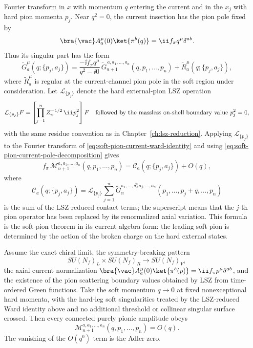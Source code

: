 Fourier transform in \(x\) with momentum \(q\) entering the current and in
the \(x_j\) with hard pion momenta \(p_j\).  Near \(q^2=0\), the current
insertion has the pion pole fixed by
\[
  \bra{\vac}A_a^\mu(0)\ket{\pi^b(q)}
  =
  \ii f_\pi q^\mu\delta^{ab}.
\]
Thus its singular part has the form
\begin{equation}
  \widetilde G_a^\mu(q;\{p_j,a_j\})
  =
  \frac{-\ii f_\pi q^\mu}{q^2-\ii0}\,
  \widetilde G_{n+1}^{\,a,a_1,\ldots,a_n}(q,p_1,\ldots,p_n)
  +\widetilde R_a^\mu(q;\{p_j,a_j\}),
  \label{eq:soft-pion-current-pole-decomposition}
\end{equation}
where \(\widetilde R_a^\mu\) is regular at the current-channel pion pole in the
soft region under consideration.  Let \(\mathcal L_{\{p_j\}}\) denote the hard
external-pion LSZ operation
\[
  \mathcal L_{\{p_j\}}F
  =
  \left[
  \prod_{j=1}^n
  Z_\pi^{-1/2}\,\ii p_j^2
  \right]F
  \quad\hbox{followed by the massless on-shell boundary value }p_j^2=0,
\]
with the same residue convention as in Chapter~\ref{ch:lsz-reduction}.  Applying
\(\mathcal L_{\{p_j\}}\) to the Fourier transform of
\eqref{eq:soft-pion-current-ward-identity} and using
\eqref{eq:soft-pion-current-pole-decomposition} gives
\begin{equation}
  f_\pi\,
  \mathcal M_{n+1}^{a,a_1,\ldots,a_n}(q,p_1,\ldots,p_n)
  =
  \mathcal C_a(q;\{p_j,a_j\})
  +O(q),
  \label{eq:soft-pion-pre-adler-identity}
\end{equation}
where
\[
  \mathcal C_a(q;\{p_j,a_j\})
  =
  \mathcal L_{\{p_j\}}
  \sum_{j=1}^n
  \widetilde G_n^{a_1,\ldots,\delta_A^a a_j,\ldots,a_n}
  (p_1,\ldots,p_j+q,\ldots,p_n)
\]
is the sum of the LSZ-reduced contact terms; the superscript means that the
\(j\)-th pion operator has been replaced by its renormalized axial variation.
This formula is the soft-pion theorem in its current-algebra form: the leading
soft pion is determined by the action of the broken charge on the hard external
states.

\begin{theorem}
\label{thm:adler-zero-chiral-pions}
Assume the exact chiral limit, the symmetry-breaking pattern
\[
  SU(N_f)_L\times SU(N_f)_R\longrightarrow SU(N_f)_V,
\]
the axial-current normalization
\(\bra{\vac}A_a^\mu(0)\ket{\pi^b(p)}=\ii f_\pi p^\mu\delta^{ab}\), and the
existence of the pion scattering boundary values obtained by LSZ from
time-ordered Green functions.  Take the soft momentum \(q\to0\) at fixed
nonexceptional hard momenta, with the hard-leg soft singularities treated by
the LSZ-reduced Ward identity above and no additional threshold or collinear
singular surface crossed.  Then every connected purely pionic amplitude obeys
\begin{equation}
  \mathcal M_{n+1}^{a,a_1,\ldots,a_n}(q,p_1,\ldots,p_n)
  =
  O(q).
  \label{eq:adler-zero-general}
\end{equation}
The vanishing of the \(O(q^0)\) term is the Adler zero.
\end{theorem}

